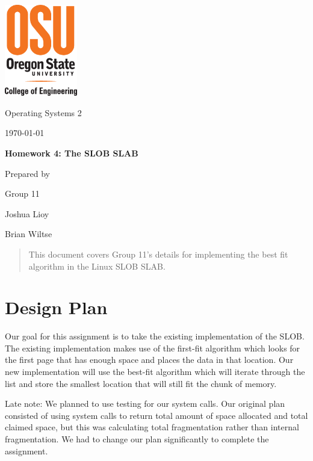 \documentclass[letterpaper, onecolumn, draftclsnofoot, 10pt, compsoc]{IEEEtran}
\def \GroupNumber{11}
\def \GroupMemberOne{Joshua Lioy}
\def \GroupMemberTwo{Brian Wiltse}
\begin{document}
\begin{titlepage}
    \begin{singlespace}
    	\includegraphics[height=4cm]{coe_v_spot1}
        \hfill 
        \par\vspace{.2in}
        \centering
        \scshape{
            \huge Operating Systems 2 \par
            {\large\today}\par
            \vspace{.5in}
            \textbf{\Huge Homework 4: The SLOB SLAB}\par
            \vfill
            \vspace{5pt}
            {\large Prepared by }\par
            Group \GroupNumber\par
            \vspace{5pt}
            {\Large
                \GroupMemberOne\par
                \GroupMemberTwo\par
            }
            \vspace{20pt}
        }
        \begin{abstract}
        This document covers Group 11's details for implementing the best fit algorithm in the Linux SLOB SLAB.
        \end{abstract}     
    \end{singlespace}
\end{titlepage}

\newpage
{}
\tableofcontents

\newpage
\section{Design Plan}
    \begin{singlespace}
        Our goal for this assignment is to take the existing implementation of the SLOB. The existing implementation makes use of the first-fit algorithm which looks for the first page that has enough space and places the data in that location. Our new implementation will use the best-fit algorithm which will iterate through the list and store the smallest location that will still fit the chunk of memory.
        
        Late note: We planned to use testing for our system calls. Our original plan consisted of using system calls to return total amount of space allocated and total claimed space, but this was calculating total fragmentation rather than internal fragmentation. We had to change our plan significantly to complete the assignment.
    \end{singlespace}
    
\end{document}
